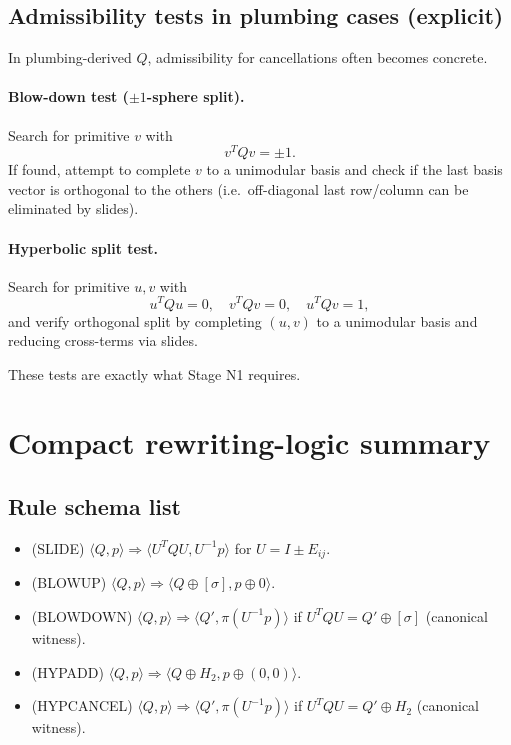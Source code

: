 \documentclass[11pt]{article}
\newcommand{\proj}{\pi}
\newcommand{\cfg}[2]{\langle #1,#2\rangle}
\newcommand{\Rule}[1]{\textsc{(#1)}}
\begin{document}
\subsection{Admissibility tests in plumbing cases (explicit)}
In plumbing-derived $Q$, admissibility for cancellations often becomes concrete.

\paragraph{Blow-down test ($\pm 1$-sphere split).}
Search for primitive $v$ with
\[
v^TQv=\pm 1.
\]
If found, attempt to complete $v$ to a unimodular basis and check if the last basis vector is orthogonal to the others (i.e.\ off-diagonal last row/column can be eliminated by slides).

\paragraph{Hyperbolic split test.}
Search for primitive $u,v$ with
\[
u^TQu=0,\quad v^TQv=0,\quad u^TQv=1,
\]
and verify orthogonal split by completing $(u,v)$ to a unimodular basis and reducing cross-terms via slides.

These tests are exactly what Stage N1 requires.

\section{Compact rewriting-logic summary}

\subsection{Rule schema list}
\begin{itemize}
\item \Rule{SLIDE} $\cfg{Q}{p}\Rightarrow \cfg{U^TQU}{U^{-1}p}$ for $U=I\pm E_{ij}$.
\item \Rule{BLOWUP} $\cfg{Q}{p}\Rightarrow \cfg{Q\oplus[\sigma]}{p\oplus 0}$.
\item \Rule{BLOWDOWN} $\cfg{Q}{p}\Rightarrow \cfg{Q'}{\proj(U^{-1}p)}$ if $U^TQU=Q'\oplus[\sigma]$ (canonical witness).
\item \Rule{HYPADD} $\cfg{Q}{p}\Rightarrow \cfg{Q\oplus H_2}{p\oplus(0,0)}$.
\item \Rule{HYPCANCEL} $\cfg{Q}{p}\Rightarrow \cfg{Q'}{\proj(U^{-1}p)}$ if $U^TQU=Q'\oplus H_2$ (canonical witness).
\end{itemize}
\end{document}
